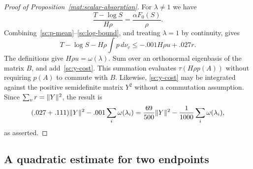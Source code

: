 \begin{proof}[Proof of Proposition~\ref{mat:scalar-absorption}]
For $\lambda\ne1$ we have
\[
 \frac{T-\log S}{H\rho}=\frac{\alpha F_0(S)}{\rho}.
\]
Combining~\eqref{sc:p-mean}--\eqref{sc:log-bound}, and treating $\lambda=1$
by continuity, gives
\[
 T-\log S-H\rho\int p\,d\nu_v
       \le -.001H\rho u+.027r.
\]
The definitions give $H\rho u=\omega(\lambda)$.  Sum over an orthonormal
eigenbasis of the matrix $B$, and add~\eqref{sc:y-cost}.
This summation evaluates $\tau(H\rho p(A))$ without requiring $p(A)$
to commute with $B$.  Likewise, \eqref{sc:y-cost} may be integrated
against the positive semidefinite matrix $Y^2$ without a commutation
assumption.  Since $\sum_v r=\lVert Y\rVert^2$, the result is
\[
 (.027+.111)\lVert Y\rVert^2-.001\sum_i\omega(\lambda_i)
 =\frac{69}{500}\lVert Y\rVert^2-\frac1{1000}\sum_i\omega(\lambda_i),
\]
as asserted.
\end{proof}

\subsection{A quadratic estimate for two endpoints}\label{sc:pair-proof}

